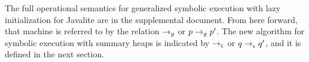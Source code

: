The full operational semantics for generalized symbolic execution with
lazy initialization for Javalite are in the supplemental
document. From here forward, that machine is referred to by the
relation $\rightarrow_{g}$ or $p \rightarrow_{g} p^\prime$. The new algorithm for symbolic
execution with summary heaps is indicated by $\rightarrow_{\varsigma}$ or $q \rightarrow_{\varsigma}
q^\prime$, and it is defined in the next section.
